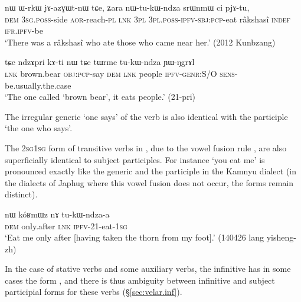 \begin{exe}
\ex \label{ex:tukWndza.nmlz}
 \gll nɯ ɯ-rkɯ jɤ-azɣɯt-nɯ tɕe, ʑara nɯ-tu-kɯ-ndza srɯnmɯ ci pjɤ-tu, \\
 \textsc{dem} \textsc{3sg}.\textsc{poss}-side \textsc{aor}-reach-\textsc{pl} \textsc{lnk} \textsc{3pl} \textsc{3pl}.\textsc{poss}-\textsc{ipfv}-\textsc{sbj}:\textsc{pcp}-eat râkshasî \textsc{indef} \textsc{ifr}.\textsc{ipfv}-be \\
\glt `There was a râkshasî who ate those who came near her.' (2012 Kunbzang) 
\end{exe}

\begin{exe}
\ex \label{ex:tukWndza.genr}
 \gll tɕe ndzɤpri kɤ-ti nɯ tɕe tɯrme tu-kɯ-ndza ɲɯ-ŋgrɤl  \\
 \textsc{lnk} brown.bear \textsc{obj}:\textsc{pcp}-say \textsc{dem} \textsc{lnk} people \textsc{ipfv}-\textsc{genr}:S/O \textsc{sens}-be.usually.the.case \\
\glt `The one called `brown bear', it eats people.' (21-pri)
\end{exe}
 
The irregular generic  `one says' of the verb  is also identical with the participle `the one who says'.

The \textsc{2sg}\fl{}\textsc{1sg} form of transitive verbs in , due to the vowel fusion rule  \fl{} , are also superficially identical to subject participles. For instance  `you eat me' is pronounced  exactly like the generic and the participle  in the Kamnyu dialect (in the dialects of Japhug where this vowel fusion does not occur, the forms remain distinct).

\begin{exe}
\ex \label{ex:tukWndzaa}
 \gll nɯ kóʁmɯz nɤ tu-kɯ-ndza-a \\
 \textsc{dem} only.after \textsc{lnk} \textsc{ipfv}-2\fl{}1-eat-\textsc{1sg} \\
 \glt `Eat me only after [having taken the thorn from my foot].' (140426 lang yisheng-zh)
\end{exe} 

In the case of stative verbs and some auxiliary verbs, the infinitive has in some cases the form , and there is thus ambiguity between infinitive and subject participial forms for these verbs (§\ref{sec:velar.inf}).


